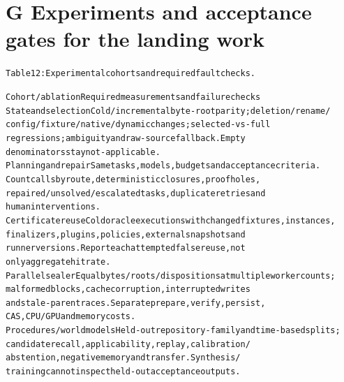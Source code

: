 \documentclass{article}
\begin{document}
\section*{G Experiments and acceptance gates for the landing work}

\begingroup\fontsize{7}{8.4}\selectfont
\begin{alltt}
Table 12: Experimental cohorts and required fault checks.
\end{alltt}\endgroup

\begingroup\fontsize{7}{8.4}\selectfont
\begin{alltt}
Cohort / ablation                            Required measurements and failure checks
State and selection                          Cold/incremental byte-root parity; deletion/rename/
                                             config/fixture/native/dynamic changes; selected-vs-full
                                             regressions; ambiguity and raw-source fallback. Empty
                                             denominators stay not-applicable.
Planning and repair                          Same tasks, models, budgets and acceptance criteria.
                                             Count calls by route, deterministic closures, proof holes,
                                             repaired/unsolved/escalated tasks, duplicate retries and
                                             human interventions.
Certificate reuse                            Cold oracle executions with changed fixtures, instances,
                                             finalizers, plugins, policies, external snapshots and
                                             runner versions. Report each attempted false reuse, not
                                             only aggregate hit rate.
Parallel sealer                              Equal bytes/roots/dispositions at multiple worker counts;
                                             malformed blocks, cache corruption, interrupted writes
                                             and stale-parent races. Separate prepare, verify, persist,
                                             CAS, CPU/GPU and memory costs.
Procedures / world models                    Held-out repository-family and time-based splits;
                                             candidate recall, applicability, replay, calibration/
                                             abstention, negative memory and transfer. Synthesis/
                                             training cannot inspect held-out acceptance outputs.

\end{alltt}
\end{document}

